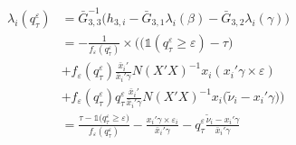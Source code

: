 \documentclass[
  authoryear,
  preprint,
  1p]{elsarticle}
\begin{document}
\[\begin{aligned}
\lambda_i(q^\varepsilon_\tau)&=\bar G_{3,3}^{-1}
\Big(
 h_{3,i}-\bar G_{3,1} \lambda_i(\beta)-\bar G_{3,2} \lambda_i(\gamma)
\Big) \\
&=-\frac{1}{f_{\varepsilon}(q^\varepsilon_\tau)} \times \Bigg( \Big(\mathbb{1} ( q^\varepsilon_\tau  \geq \varepsilon  ) - \tau \Big)  \\
&+ f_{\varepsilon} (q^\varepsilon_\tau) \frac{\bar x_i'}{\bar x_i'\gamma} 
N (X'X)^{-1} x_i  ( x_i'\gamma \times \varepsilon) \\
&+ f_{\varepsilon}(q^\varepsilon_\tau) q^\varepsilon_\tau \frac{\bar x_i'}{\bar x_i'\gamma} N(X'X)^{-1} x_i   \big( \tilde \nu_i -x_i' 
  \gamma \big) 
\Bigg) \\
&=\frac{\tau-\mathbb{1}\big( q^\varepsilon_\tau  \geq \varepsilon  \big) }{f_{\varepsilon}(q^\varepsilon_\tau)}
- \frac{ x_i'\gamma \times \varepsilon_i }{\bar x_i'\gamma} 
-  q^\varepsilon_\tau \frac{ \tilde \nu_i -x_i' 
  \gamma }{\bar x_i'\gamma} 
\end{aligned}
\]


\renewcommand\refname{References}
  
\end{document}
